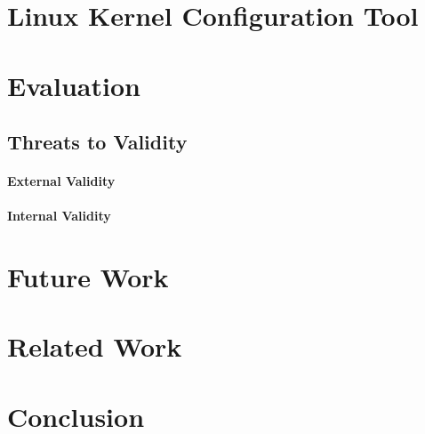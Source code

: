 \documentclass{chi2009}
\newcommand{\todo}[1]{\textsf{\textbf{\textcolor{Orange}{[[#1]]}}}}
\begin{document}

\section{Linux Kernel Configuration Tool}\label{sec:lkc}





\section{Evaluation}\label{sec:evaluation}


\subsection{Threats to Validity}

\paragraph{External Validity}

\paragraph{Internal Validity}

\section{Future Work}\label{sec:futurework}



\section{Related Work}\label{sec:relatedwork}

\section{Conclusion}\label{sec:conclusion}

\nocite{*}



\end{document}
